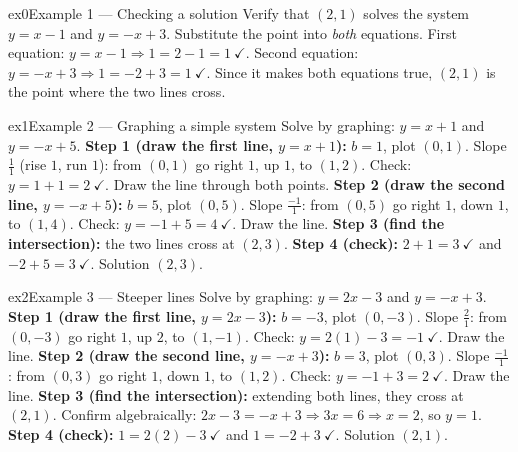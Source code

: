 \documentclass[11pt]{article}
\begin{document}
\begin{example}{ex0}{Example 1 --- Checking a solution}
Verify that $(2,1)$ solves the system $y=x-1$ and $y=-x+3$.
\soln Substitute the point into \emph{both} equations. First equation: $y=x-1\Rightarrow 1=2-1=1\ \checkmark$. Second equation: $y=-x+3\Rightarrow 1=-2+3=1\ \checkmark$. Since it makes both equations true, $(2,1)$ is the point where the two lines cross.
\end{example}

\begin{example}{ex1}{Example 2 --- Graphing a simple system}
Solve by graphing: $y=x+1$ and $y=-x+5$.
\soln \textbf{Step 1 (draw the first line, $y=x+1$):} $b=1$, plot $(0,1)$. Slope $\tfrac11$ (rise $1$, run $1$): from $(0,1)$ go right $1$, up $1$, to $(1,2)$. Check: $y=1+1=2\ \checkmark$. Draw the line through both points.
\textbf{Step 2 (draw the second line, $y=-x+5$):} $b=5$, plot $(0,5)$. Slope $\tfrac{-1}{1}$: from $(0,5)$ go right $1$, down $1$, to $(1,4)$. Check: $y=-1+5=4\ \checkmark$. Draw the line.
\textbf{Step 3 (find the intersection):} the two lines cross at $(2,3)$.
\textbf{Step 4 (check):} $2+1=3\ \checkmark$ and $-2+5=3\ \checkmark$. Solution $(2,3)$.
\end{example}

\begin{example}{ex2}{Example 3 --- Steeper lines}
Solve by graphing: $y=2x-3$ and $y=-x+3$.
\soln \textbf{Step 1 (draw the first line, $y=2x-3$):} $b=-3$, plot $(0,-3)$. Slope $\tfrac21$: from $(0,-3)$ go right $1$, up $2$, to $(1,-1)$. Check: $y=2(1)-3=-1\ \checkmark$. Draw the line.
\textbf{Step 2 (draw the second line, $y=-x+3$):} $b=3$, plot $(0,3)$. Slope $\tfrac{-1}{1}$: from $(0,3)$ go right $1$, down $1$, to $(1,2)$. Check: $y=-1+3=2\ \checkmark$. Draw the line.
\textbf{Step 3 (find the intersection):} extending both lines, they cross at $(2,1)$. Confirm algebraically: $2x-3=-x+3\Rightarrow 3x=6\Rightarrow x=2$, so $y=1$.
\textbf{Step 4 (check):} $1=2(2)-3\ \checkmark$ and $1=-2+3\ \checkmark$. Solution $(2,1)$.
\end{example}
\end{document}
